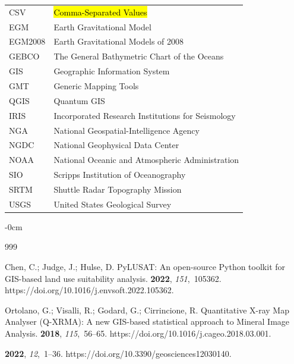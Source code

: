 \documentclass[data,article,accept,pdftex,moreauthors]{Definitions/mdpi}
\begin{document}
{{\noindent 
\begin{tabular}{@{}ll}
CSV & \hl{Comma-Separated Values} %
 \\
EGM & Earth Gravitational Model \\ 
EGM2008 & Earth Gravitational Models of 2008\\
GEBCO & The General Bathymetric Chart of the Oceans \\
GIS & Geographic Information System \\
GMT & Generic Mapping Tools \\
QGIS & Quantum GIS \\
IRIS & Incorporated Research Institutions for Seismology \\
NGA & National Geospatial-Intelligence Agency \\
NGDC & National Geophysical Data Center \\
NOAA & National Oceanic and Atmospheric Administration \\
SIO & Scripps Institution of Oceanography \\
SRTM & Shuttle Radar Topography Mission \\
USGS & United States Geological Survey 
\end{tabular}}

\begin{adjustwidth}{-\extralength}{0cm}
\begin{thebibliography}{999}

Chen, C.; Judge, J.; Hulse, D.
\newblock PyLUSAT: An open-source Python toolkit for GIS-based land use
 suitability analysis.
 {\bf 2022}, {\em
 151},~105362.
https://doi.org/10.1016/j.envsoft.2022.105362.

Ortolano, G.; Visalli, R.; Godard, G.; Cirrincione, R.
\newblock Quantitative X-ray Map Analyser (Q-XRMA): A new GIS-based statistical
 approach to Mineral Image Analysis.
 {\bf 2018}, {\em 115},~56--65.
https://doi.org/10.1016/j.cageo.2018.03.001.

 {\bf 2022}, {\em 12},~1--36.
https://doi.org/10.3390/geosciences12030140.


\end{thebibliography}
\end{adjustwidth}}
\end{document}

